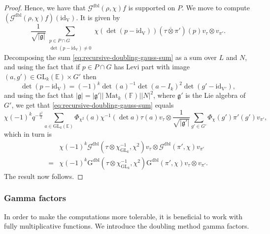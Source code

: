 \documentclass[12pt, reqno]{amsart}
\theoremstyle{definition}
\theoremstyle{definition}
\theoremstyle{definition}
\newcommand{\idmap}{\mathrm{id}}
\newcommand{\sizeof}[1]{\left|#1\right|}
\newcommand{\hermitianSpace}{\mathrm{V}}
\newcommand{\GL}{\mathrm{GL}}
\newcommand{\finiteField}{\mathbb{F}}
\newcommand{\quadraticExtension}{\mathbb{E}}
\newcommand{\squareMatrix}{\operatorname{Mat}}
\newcommand{\dblGaussSum}[2]{\mathcal{G}^{\mathrm{dbl}}\left(#1, #2\right)}
\newcommand{\dblGaussSumScalar}[2]{\mathrm{G}^{\mathrm{dbl}}\left(#1, #2\right)}
\newcommand{\lieAlgebra}{\mathfrak{g}}
\begin{document}
\begin{proof}
	Hence, we have that $\dblGaussSum{\rho}{\chi} f$ is supported on $P$. We move to compute $\left(\dblGaussSum{\rho}{\chi} f\right)\left(\idmap_{\hermitianSpace}\right)$. It is given by
	\begin{equation}\label{eq:recursive-doubling-gauss-sum}
		\frac{1}{\sqrt{\sizeof{\lieAlgebra}}} \sum_{\substack{p \in P \cap G\\
				\det\left(p - \idmap_{\hermitianSpace}\right) \ne 0}} \chi\left(\det\left(p - \idmap_{\hermitianSpace}\right)\right) \left(\tau \overline{\otimes} \pi'\right)\left(p\right) v_{\tau} \otimes v_{\pi'}.
	\end{equation}
	Decomposing the sum \eqref{eq:recursive-doubling-gauss-sum} as a sum over $L$ and $N$, and using the fact that if $p \in P \cap G$ has Levi part with image $\left(a, g'\right) \in \GL_k\left(\quadraticExtension\right) \times G'$ then $$\det\left(p - \idmap_{\hermitianSpace}\right) = \left(-1\right)^k \det\left(a\right)^{-1}\det\left(a - I_k\right)^2 \det\left( g' - \idmap_{\hermitianSpace'}\right),$$
	and using the fact that $\sizeof{\lieAlgebra} = \sizeof{\lieAlgebra'} \sizeof{\squareMatrix_k\left(\finiteField\right)} \sizeof{N}^2$, where $\lieAlgebra'$ is the Lie algebra of $G'$,
	we get that \eqref{eq:recursive-doubling-gauss-sum} equals
	\begin{equation}
		\chi\left(-1\right)^k q^{-\frac{k^2}{2}} \sum_{a \in \GL_k\left(\quadraticExtension\right)} \Phi_{\chi^2}\left(a\right) \chi^{-1}\left(\det a\right) \tau\left(a\right) v_{\tau} \otimes \frac{1}{\sqrt{\sizeof{\lieAlgebra'}}} \sum_{g' \in G'} \Phi_{\chi}\left(g'\right) \pi'\left(g'\right) v_{\pi'},
	\end{equation}
	which in turn is
	\begin{align*}
		&\chi\left(-1\right)^k \dblGaussSum{\tau \otimes \chi_{\GL_k}^{-1}}{\chi^2} v_{\tau} \otimes \dblGaussSum{\pi'}{\chi} v_{\pi'}\\
		=& \chi\left(-1\right)^k\dblGaussSumScalar{\tau \otimes \chi_{\GL_k}^{-1}}{\chi^2} \dblGaussSumScalar{\pi'}{\chi} v_{\tau} \otimes v_{\pi'}.
	\end{align*}
	The result now follows.
\end{proof}

\subsubsection{Gamma factors}
In order to make the computations more tolerable, it is beneficial to work with fully multiplicative functions. We introduce the doubling method gamma factors.
\end{document}
